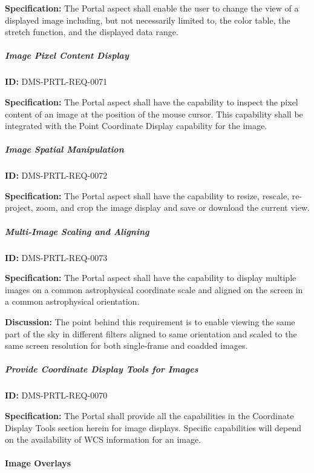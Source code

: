 \documentclass[SE,toc,lsstdraft]{lsstdoc}
\begin{document}
\textbf{Specification:}
The Portal aspect shall enable the user to change the view of a displayed image including, but not necessarily limited to, the color table, the stretch function, and the displayed data range.

\subparagraph{Image Pixel Content Display}\hfill  %

\label{DMS-PRTL-REQ-0071}
\textbf{ID:} DMS-PRTL-REQ-0071

\textbf{Specification:}
The Portal aspect shall have the capability to inspect the pixel content of an image at the position of the mouse cursor.  This capability shall be integrated with the Point Coordinate Display capability for the image.

\subparagraph{Image Spatial Manipulation}\hfill  %

\label{DMS-PRTL-REQ-0072}
\textbf{ID:} DMS-PRTL-REQ-0072

\textbf{Specification:}
The Portal aspect shall have the capability to resize, rescale, re-project, zoom, and crop the image display and save or download the current view.

\subparagraph{Multi-Image Scaling and Aligning}\hfill  %

\label{DMS-PRTL-REQ-0073}
\textbf{ID:} DMS-PRTL-REQ-0073

\textbf{Specification:}
The Portal aspect shall have the capability to display multiple images on a common astrophysical coordinate scale and aligned on the screen in a common astrophysical orientation.

\textbf{Discussion:}
The point behind this requirement is to enable viewing the same part of the sky in different filters aligned to same orientation and scaled to the same screen resolution for both single-frame and coadded images.

\subparagraph{Provide Coordinate Display Tools for Images}\hfill  %

\label{DMS-PRTL-REQ-0070}
\textbf{ID:} DMS-PRTL-REQ-0070

\textbf{Specification:}
The Portal shall provide all the capabilities in the Coordinate Display Tools section herein for image displays.  Specific capabilities will depend on the availability of WCS information for an image.

\paragraph{Image Overlays}\hfill  %
\end{document}
